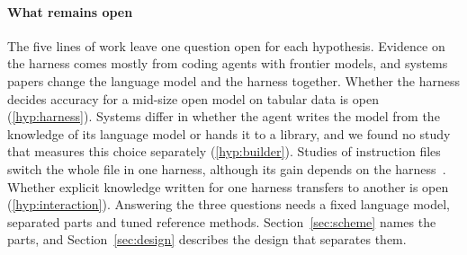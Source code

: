 \paragraph{What remains open} The five lines of work leave one question
open for each hypothesis. Evidence on the harness comes mostly from coding
agents with frontier models, and systems papers change the language model
and the harness together. Whether the harness decides accuracy for a
mid-size open model on tabular data is open
(\ref{hyp:harness}). Systems differ in whether the agent writes
the model from the knowledge of its language model or hands it to a
library, and we found no study that measures this choice separately
(\ref{hyp:builder}). Studies of instruction files switch the whole file in
one harness, although its gain depends on the
harness~\citep{li2026skillsbench}. Whether explicit knowledge written for
one harness transfers to another is open (\ref{hyp:interaction}).
Answering the three questions needs a fixed language model, separated parts
and tuned reference methods. Section~\ref{sec:scheme} names the parts, and
Section~\ref{sec:design} describes the design that separates them.
